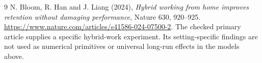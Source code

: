 \documentclass[11pt,a4paper]{article}
\begin{document}
\begin{thebibliography}{9}
 N. Bloom, R. Han and J. Liang (2024), \emph{Hybrid working from home improves retention without damaging performance}, Nature 630, 920--925. \url{https://www.nature.com/articles/s41586-024-07500-2}. The checked primary article supplies a specific hybrid-work experiment. Its setting-specific findings are not used as numerical primitives or universal long-run effects in the models above.
\end{thebibliography}
\end{document}
